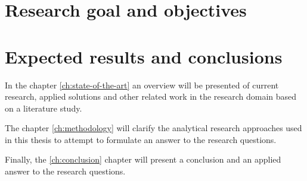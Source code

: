 
\section{Research goal and objectives}
\label{sec:research-goal-and-objectives}


\section{Expected results and conclusions}


\clearpage{}

In the chapter \autoref{ch:state-of-the-art} an overview will be presented of current research, applied solutions and other related work in the research domain based on a literature study.

The chapter \ref{ch:methodology} will clarify the analytical research approaches used in this thesis to attempt to formulate an answer to the research questions.

Finally, the \ref{ch:conclusion} chapter will present a conclusion and an applied answer to the research questions.
